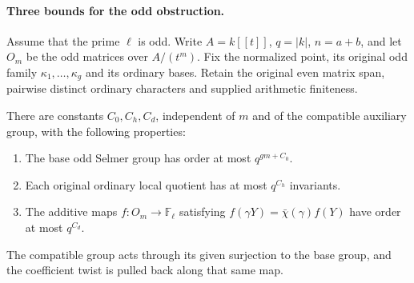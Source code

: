 \paragraph{Three bounds for the odd obstruction.}
Assume that the prime $\ell$ is odd. Write $A=k[[t]]$, $q=|k|$,
$n=a+b$, and let $O_m$ be the odd
matrices over $A/(t^m)$. Fix the normalized point, its original
odd family $\kappa_1,\ldots,\kappa_g$ and its ordinary bases.
Retain the original even matrix span, pairwise distinct ordinary
characters and supplied arithmetic finiteness.

\begin{proposition}
\label{prop:selmer-second-bound-suppliers}
There are constants $C_0,C_h,C_d$, independent of $m$ and of
the compatible auxiliary group, with the following properties:
\begin{enumerate}
\item The base odd Selmer group has order at most $q^{gm+C_0}$.
\item Each original ordinary local quotient has at most $q^{C_h}$
invariants.
\item The additive maps $f:O_m\to\mathbb F_\ell$ satisfying
$f(\gamma Y)=\bar\chi(\gamma)f(Y)$ have order at most $q^{C_d}$.
\end{enumerate}
The compatible group acts through its given surjection to the
base group, and the coefficient twist is pulled back along that
same map.
\end{proposition}

